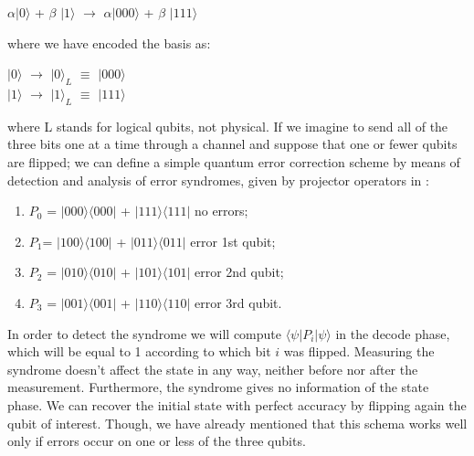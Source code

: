 \documentclass{Configuration_Files/PoliMi3i_thesis}
\begin{document}
\begin{center}
	$\alpha |0 \rangle$ + $\beta$ $|1 \rangle$ $\rightarrow$ $\alpha |000 \rangle$ + $\beta$ $|111 \rangle$
\end{center}

where we have encoded the basis as:

\begin{center}
	$|0 \rangle$ $\rightarrow$ $|0 \rangle_L$ $\equiv$ $|000 \rangle$   \\
	$|1 \rangle$ $\rightarrow$ $|1 \rangle_L$ $\equiv$ $|111 \rangle$
\end{center}

where L stands for logical qubits, not physical. \newline
If we imagine to send all of the three bits one at a time through a channel and suppose that one or fewer qubits are flipped; we can define a simple quantum error correction scheme by means of detection and analysis of error syndromes, given by projector operators in \cite{Nie06}:

\begin{enumerate}
	\item  $P_0$ = $|000 \rangle \langle 000|$ + $|111 \rangle \langle 111|$ no errors;
	\item $P_1$= $|100 \rangle \langle 100|$ + $|011 \rangle \langle 011|$ error 1st qubit;
	\item $P_2$ = $|010 \rangle \langle 010|$ + $|101 \rangle \langle 101|$ error 2nd qubit;
	\item $P_3$ = $|001 \rangle \langle 001|$ + $|110 \rangle \langle 110|$ error 3rd qubit.
\end{enumerate}

In order to detect the syndrome we will compute $\langle \psi| P_i | \psi \rangle $ in the decode phase, which will be equal to 1 according to which bit $i$ was flipped.
Measuring the syndrome doesn't affect the state in any way, neither before nor after the measurement. Furthermore, the syndrome gives no information of the state phase. We can recover the initial state with perfect accuracy by flipping again the qubit of interest. Though, we have already mentioned that this schema works well only if errors occur on one or less of the three qubits.\newline
 
\end{document}
